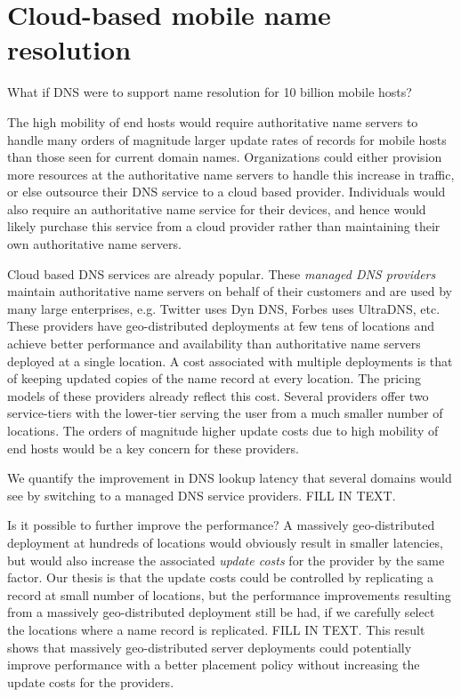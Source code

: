 
\section{Cloud-based mobile name resolution}


What if DNS were to support name resolution for 10 billion mobile hosts? 

The high mobility of end hosts would require authoritative name servers to handle many orders of magnitude larger update rates of records for mobile hosts than those seen for current domain names. Organizations could either provision more resources at the authoritative name servers to handle this increase in traffic, or else outsource their DNS service to a cloud based provider. Individuals would also require an authoritative name service for their devices, and hence would likely purchase this service from a cloud provider rather than maintaining their own authoritative name servers.

Cloud based DNS services are already popular. These \emph{managed DNS providers} maintain authoritative name servers on behalf of their customers and are used by many large enterprises, e.g. Twitter uses Dyn DNS, Forbes uses UltraDNS, etc. These providers have  geo-distributed deployments at few tens of locations and achieve better performance and availability than authoritative name servers deployed at a single location. A cost associated with multiple deployments is that of keeping updated copies of the name record at every location. The pricing models of these providers already reflect this cost. Several providers offer two service-tiers with the lower-tier serving  the user from  a much smaller number of locations. The orders of magnitude higher update costs due to high mobility of end hosts would be a key concern for these providers.

We quantify the improvement in DNS lookup latency that several domains would see by switching to a managed DNS service providers. FILL IN TEXT.


Is it possible to further improve the performance? A massively geo-distributed deployment at hundreds of locations would obviously result in smaller latencies, but would also increase the associated \emph{update costs} for the provider by the same factor. Our thesis is that the update costs could be controlled by replicating a record at small number of locations, but the performance improvements resulting from a massively geo-distributed deployment still be had, if we carefully select the locations where a name record is replicated. FILL IN TEXT. This result shows that massively geo-distributed server deployments could potentially improve  performance with a better placement policy without increasing the update costs for the providers.


